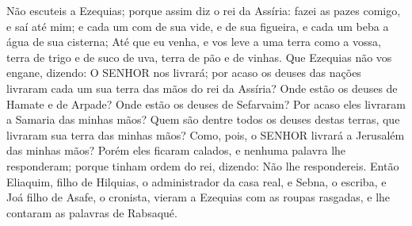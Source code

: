 {  Não escuteis a Ezequias; porque assim diz o rei da Assíria: fazei as pazes comigo, e saí até mim; e cada um com de sua vide, e de sua figueira, e cada um beba a água de sua
{} cisterna;
  Até que eu venha, e vos leve a uma terra como a vossa, terra de trigo e de suco de uva, terra de pão e de vinhas.
  Que Ezequias não vos engane, dizendo: O SENHOR nos livrará; por acaso os deuses das nações livraram cada um sua terra das mãos do rei da Assíria?
  Onde estão os deuses de Hamate e de Arpade? Onde estão os deuses de Sefarvaim? Por acaso eles livraram a Samaria das minhas mãos?
  Quem são dentre todos os deuses destas terras, que livraram sua terra das minhas mãos? Como, pois, o SENHOR livrará a Jerusalém das minhas mãos?
  Porém eles ficaram calados, e nenhuma palavra lhe responderam; porque tinham ordem do rei, dizendo: Não lhe respondereis.
  Então Eliaquim, filho de Hilquias, o administrador da casa real, e Sebna, o escriba, e Joá filho de Asafe, o cronista, vieram a Ezequias com as roupas rasgadas, e lhe contaram as palavras de Rabsaqué.
\par }

